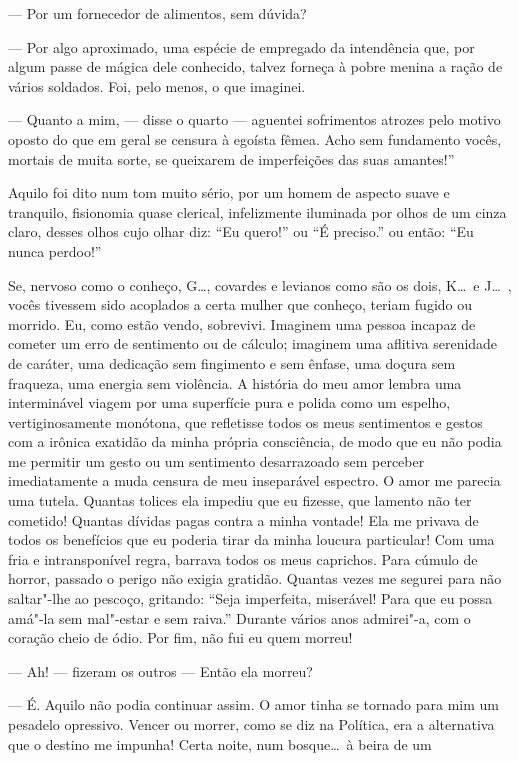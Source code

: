 --- Por um fornecedor de alimentos, sem dúvida?

--- Por algo aproximado, uma espécie de empregado da intendência que,
por algum passe de mágica dele conhecido, talvez forneça à pobre
menina a ração de vários soldados. Foi, pelo menos, o que imaginei.

--- Quanto a mim, --- disse o quarto --- aguentei sofrimentos atrozes pelo motivo oposto do que em geral se censura à egoísta fêmea. Acho sem fundamento vocês, mortais de muita sorte, se queixarem de imperfeições das suas
amantes!”

Aquilo foi dito num tom muito sério, por um homem de aspecto suave e
tranquilo, fisionomia quase clerical, infelizmente iluminada por
olhos de um cinza claro, desses olhos cujo olhar diz: “Eu
quero!'' ou “É preciso.'' ou
então: “Eu nunca perdoo!''

Se, nervoso como o conheço, G\ldots, covardes e levianos
como são os dois, K\ldots\  e J\ldots\ , vocês tivessem sido acoplados a 
certa mulher que conheço, teriam fugido ou morrido. Eu, como
estão vendo, sobrevivi. Imaginem uma pessoa incapaz de cometer um erro
de sentimento ou de cálculo; imaginem uma aflitiva serenidade de
caráter, uma dedicação sem fingimento e sem ênfase, uma doçura sem
fraqueza, uma energia sem violência. A história do meu amor lembra
uma interminável viagem por uma superfície pura e polida como um
espelho, vertiginosamente monótona, que refletisse todos os meus
sentimentos e gestos com a irônica exatidão da minha própria
consciência, de modo que eu não podia me permitir um gesto ou um
sentimento desarrazoado sem perceber imediatamente a muda censura de
meu inseparável espectro. O amor me parecia uma tutela. Quantas
tolices ela impediu que eu fizesse, que lamento não ter cometido!
Quantas dívidas pagas contra a minha vontade! Ela me privava de todos
os benefícios que eu poderia tirar da minha loucura particular!
Com uma fria e intransponível regra, barrava todos os meus
caprichos. Para cúmulo de horror, passado o
perigo não exigia gratidão. Quantas vezes me segurei para não saltar"-lhe ao pescoço,
gritando: “Seja imperfeita, miserável! Para que
eu possa amá"-la sem mal"-estar e sem raiva.'' Durante
vários anos admirei"-a, com o coração cheio de ódio. Por fim, não fui eu
quem morreu!

--- Ah! --- fizeram os outros --- Então ela morreu?

--- É. Aquilo não podia continuar assim. O amor tinha se tornado para mim
um pesadelo opressivo. Vencer ou morrer, como se diz na Política, era a
alternativa que o destino me impunha! Certa noite, num bosque\ldots\  à
beira de um \linebreak


